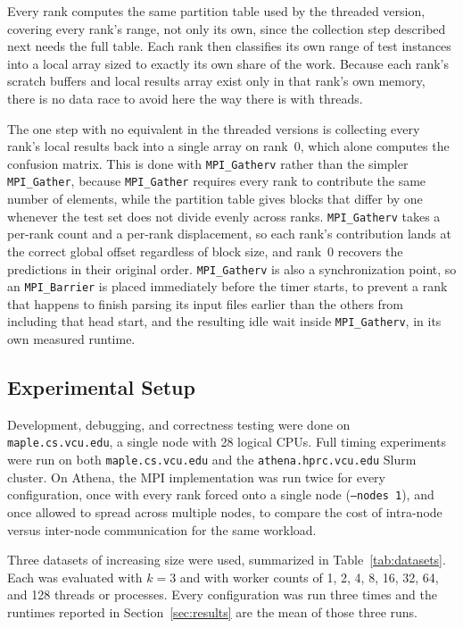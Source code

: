 \documentclass[conference]{IEEEtran}
\begin{document}
Every rank computes the same partition table used by the threaded version,
covering every rank's range, not only its own, since the collection step
described next needs the full table. Each rank then classifies its own
range of test instances into a local array sized to exactly its own share
of the work. Because each rank's scratch buffers and local results array
exist only in that rank's own memory, there is no data race to avoid here
the way there is with threads.

The one step with no equivalent in the threaded versions is collecting
every rank's local results back into a single array on rank~0, which alone
computes the confusion matrix. This is done with \texttt{MPI\_Gatherv}
rather than the simpler \texttt{MPI\_Gather}, because \texttt{MPI\_Gather}
requires every rank to contribute the same number of elements, while the
partition table gives blocks that differ by one whenever the test set does
not divide evenly across ranks. \texttt{MPI\_Gatherv} takes a per-rank
count and a per-rank displacement, so each rank's contribution lands at
the correct global offset regardless of block size, and rank~0 recovers
the predictions in their original order. \texttt{MPI\_Gatherv} is also a
synchronization point, so an \texttt{MPI\_Barrier} is placed immediately
before the timer starts, to prevent a rank that happens to finish parsing
its input files earlier than the others from including that head start,
and the resulting idle wait inside \texttt{MPI\_Gatherv}, in its own
measured runtime.

\subsection{Experimental Setup}

Development, debugging, and correctness testing were done on
\texttt{maple.cs.vcu.edu}, a single node with 28 logical CPUs. Full timing
experiments were run on both \texttt{maple.cs.vcu.edu} and the
\texttt{athena.hprc.vcu.edu} Slurm cluster. On Athena, the MPI
implementation was run twice for every configuration, once with every rank
forced onto a single node (\texttt{--nodes 1}), and once allowed to spread
across multiple nodes, to compare the cost of intra-node versus
inter-node communication for the same workload.

Three datasets of increasing size were used, summarized in
Table~\ref{tab:datasets}. Each was evaluated with $k=3$ and with worker
counts of 1, 2, 4, 8, 16, 32, 64, and 128 threads or processes. Every
configuration was run three times and the runtimes reported in
Section~\ref{sec:results} are the mean of those three runs.
\end{document}
